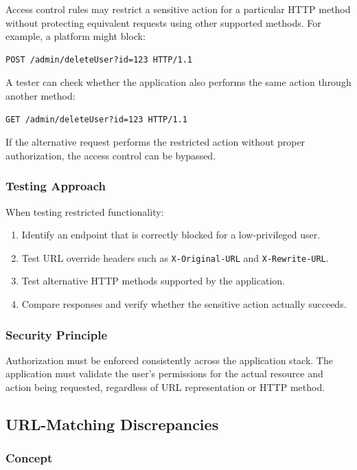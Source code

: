 \documentclass[11pt,a4paper]{article}
\begin{document}
Access control rules may restrict a sensitive action for a particular HTTP method without protecting equivalent requests using other supported methods.
For example, a platform might block:
\begin{lstlisting}[language=HTTP]
POST /admin/deleteUser?id=123 HTTP/1.1
\end{lstlisting}

A tester can check whether the application also performs the same action through another method:
\begin{lstlisting}[language=HTTP]
GET /admin/deleteUser?id=123 HTTP/1.1
\end{lstlisting}

If the alternative request performs the restricted action without proper authorization, the access control can be bypassed.

\subsubsection{Testing Approach}

When testing restricted functionality:
\begin{enumerate}
    \item Identify an endpoint that is correctly blocked for a low-privileged user.
    \item Test URL override headers such as \texttt{X-Original-URL} and \texttt{X-Rewrite-URL}.
    \item Test alternative HTTP methods supported by the application.
    \item Compare responses and verify whether the sensitive action actually succeeds.
\end{enumerate}

\subsubsection{Security Principle}

Authorization must be enforced consistently across the application stack. The application must validate the user's permissions for the actual resource and action being requested, regardless of URL representation or HTTP method.

\subsection{URL-Matching Discrepancies}

\subsubsection{Concept}
\end{document}
